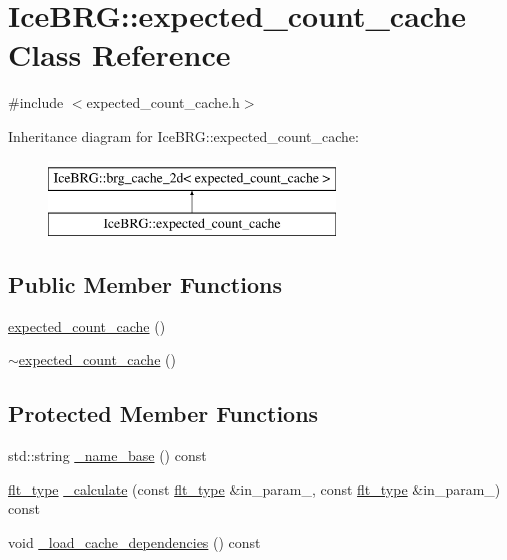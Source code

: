 \hypertarget{classIceBRG_1_1expected__count__cache}{\section{Ice\-B\-R\-G\-:\-:expected\-\_\-count\-\_\-cache Class Reference}
\label{classIceBRG_1_1expected__count__cache}
}


{\ttfamily \#include $<$expected\-\_\-count\-\_\-cache.\-h$>$}

Inheritance diagram for Ice\-B\-R\-G\-:\-:expected\-\_\-count\-\_\-cache\-:\begin{figure}[H]
\begin{center}
\leavevmode
\includegraphics[height=2.000000cm]{classIceBRG_1_1expected__count__cache}
\end{center}
\end{figure}
\subsection*{Public Member Functions}
\begin{DoxyCompactItemize}
\item 
\hyperlink{classIceBRG_1_1expected__count__cache_a2f0071d1fddd08d805724fc199631fd1}{expected\-\_\-count\-\_\-cache} ()
\item 
\hyperlink{classIceBRG_1_1expected__count__cache_a817a41f05b8d36b3791924ceb47a6f5b}{$\sim$expected\-\_\-count\-\_\-cache} ()
\end{DoxyCompactItemize}
\subsection*{Protected Member Functions}
\begin{DoxyCompactItemize}
\item 
std\-::string \hyperlink{classIceBRG_1_1expected__count__cache_a07cb2c99bf0bfba61a2da77300a6061f}{\-\_\-name\-\_\-base} () const 
\item 
\hyperlink{lib_2IceBRG__main_2common_8h_ad0f130a56eeb944d9ef2692ee881ecc4}{flt\-\_\-type} \hyperlink{classIceBRG_1_1expected__count__cache_a9b18a3e02060bd0cde404eff18fb8343}{\-\_\-calculate} (const \hyperlink{lib_2IceBRG__main_2common_8h_ad0f130a56eeb944d9ef2692ee881ecc4}{flt\-\_\-type} \&in\-\_\-param\-\_, const \hyperlink{lib_2IceBRG__main_2common_8h_ad0f130a56eeb944d9ef2692ee881ecc4}{flt\-\_\-type} \&in\-\_\-param\-\_) const 
\item 
void \hyperlink{classIceBRG_1_1expected__count__cache_a6047eeb391a812c90e190b712d2a33fc}{\-\_\-load\-\_\-cache\-\_\-dependencies} () const 
\end{DoxyCompactItemize}
